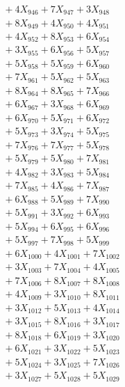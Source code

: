\documentclass[a4paper,10pt]{article}
\begin{document}
{\begin{align}
&\;  + 4 X_{946} + 7 X_{947} + 3 X_{948} \\[0.3ex]
&\;  + 8 X_{949} + 4 X_{950} + 4 X_{951} \\[0.3ex]
&\;  + 4 X_{952} + 8 X_{953} + 6 X_{954} \\[0.3ex]
&\;  + 3 X_{955} + 6 X_{956} + 5 X_{957} \\[0.3ex]
&\;  + 5 X_{958} + 5 X_{959} + 6 X_{960} \\[0.3ex]
&\;  + 7 X_{961} + 5 X_{962} + 5 X_{963} \\[0.3ex]
&\;  + 8 X_{964} + 8 X_{965} + 7 X_{966} \\[0.3ex]
&\;  + 6 X_{967} + 3 X_{968} + 6 X_{969} \\[0.5ex]\allowbreak
&\;  + 6 X_{970} + 5 X_{971} + 6 X_{972} \\[0.3ex]
&\;  + 5 X_{973} + 3 X_{974} + 5 X_{975} \\[0.3ex]
&\;  + 7 X_{976} + 7 X_{977} + 5 X_{978} \\[0.3ex]
&\;  + 5 X_{979} + 5 X_{980} + 7 X_{981} \\[0.3ex]
&\;  + 4 X_{982} + 3 X_{983} + 5 X_{984} \\[0.3ex]
&\;  + 7 X_{985} + 4 X_{986} + 7 X_{987} \\[0.3ex]
&\;  + 6 X_{988} + 5 X_{989} + 7 X_{990} \\[0.3ex]
&\;  + 5 X_{991} + 3 X_{992} + 6 X_{993} \\[0.3ex]
&\;  + 5 X_{994} + 6 X_{995} + 6 X_{996} \\[0.3ex]
&\;  + 5 X_{997} + 7 X_{998} + 5 X_{999} \\[0.5ex]\allowbreak
&\;  + 6 X_{1000} + 4 X_{1001} + 7 X_{1002} \\[0.3ex]
&\;  + 3 X_{1003} + 7 X_{1004} + 4 X_{1005} \\[0.3ex]
&\;  + 7 X_{1006} + 8 X_{1007} + 8 X_{1008} \\[0.3ex]
&\;  + 4 X_{1009} + 3 X_{1010} + 8 X_{1011} \\[0.3ex]
&\;  + 3 X_{1012} + 5 X_{1013} + 4 X_{1014} \\[0.3ex]
&\;  + 3 X_{1015} + 8 X_{1016} + 3 X_{1017} \\[0.3ex]
&\;  + 8 X_{1018} + 6 X_{1019} + 3 X_{1020} \\[0.3ex]
&\;  + 6 X_{1021} + 3 X_{1022} + 5 X_{1023} \\[0.3ex]
&\;  + 5 X_{1024} + 3 X_{1025} + 7 X_{1026} \\[0.3ex]
&\;  + 3 X_{1027} + 5 X_{1028} + 5 X_{1029} \\[0.5ex]\allowbreak

\end{align}}
\end{document}
